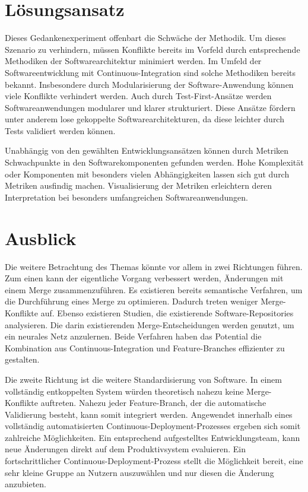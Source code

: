 \section{Lösungsansatz}

Dieses Gedankenexperiment offenbart die Schwäche der Methodik. Um dieses Szenario zu verhindern, müssen Konflikte bereits im Vorfeld durch entsprechende Methodiken der Softwarearchitektur minimiert werden. Im Umfeld der Softwareentwicklung mit Continuous-Integration sind solche Methodiken bereits bekannt. Insbesondere durch Modularisierung der Software-Anwendung können viele Konflikte verhindert werden. Auch durch Test-First-Ansätze werden Softwareanwendungen modularer und klarer strukturiert. Diese Ansätze fördern unter anderem \glqq lose gekoppelte\grqq{}  Softwarearchitekturen, da diese leichter durch Tests validiert werden können. 

Unabhängig von den gewählten Entwicklungsansätzen können durch Metriken\\ Schwachpunkte in den Softwarekomponenten gefunden werden. Hohe Komplexität oder Komponenten mit besonders vielen Abhängigkeiten lassen sich gut durch Metriken ausfindig machen. Visualisierung der Metriken erleichtern deren Interpretation bei besonders umfangreichen Softwareanwendungen. 

\section{Ausblick}

Die weitere Betrachtung des Themas könnte vor allem in zwei Richtungen führen. Zum einen kann der eigentliche Vorgang verbessert werden, Änderungen mit einem Merge zusammenzuführen. Es existieren bereits semantische Verfahren, um die Durchführung eines Merge zu optimieren. Dadurch treten weniger Merge-Konflikte auf. Ebenso existieren Studien, die existierende Software-Repositories analysieren. Die darin existierenden Merge-Entscheidungen werden genutzt, um ein neurales Netz anzulernen. Beide Verfahren haben das Potential die Kombination aus Continuous-Integration und Feature-Branches effizienter zu gestalten.

Die zweite Richtung ist die weitere Standardisierung von Software. In einem vollständig entkoppelten System würden theoretisch nahezu keine Merge-Konflikte auftreten. Nahezu jeder Feature-Branch, der die automatische Validierung besteht, kann somit integriert werden. Angewendet innerhalb eines vollständig automatisierten Continuous-Deployment-Prozesses ergeben sich somit zahlreiche Möglichkeiten. Ein entsprechend aufgestelltes Entwicklungsteam, kann neue Änderungen direkt auf dem Produktivsystem evaluieren. Ein fortschrittlicher Continuous-Deployment-Prozess stellt die Möglichkeit bereit, eine sehr kleine Gruppe an Nutzern auszuwählen und nur diesen die Änderung anzubieten.

